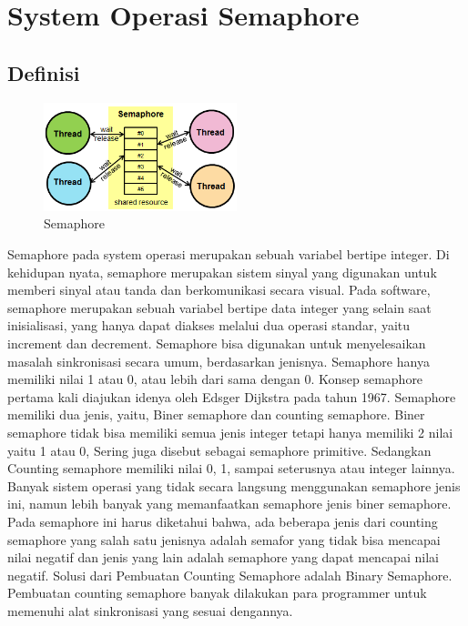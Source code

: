 \section{System Operasi Semaphore}

	\subsection{Definisi}
	
		\begin{figure}[ht]
			\centerline{\includegraphics[width=0.5\textwidth]{figures/sema.png}}
			\caption{Semaphore}
			\label{sema}
			\end{figure}
	
		Semaphore pada system operasi merupakan sebuah variabel bertipe integer. Di kehidupan nyata, semaphore merupakan sistem sinyal yang
		digunakan untuk memberi sinyal atau tanda dan berkomunikasi secara visual. Pada software, semaphore merupakan sebuah variabel bertipe data
		integer yang selain saat inisialisasi, yang hanya dapat diakses melalui dua operasi standar, yaitu increment dan decrement. Semaphore bisa digunakan untuk menyelesaikan masalah sinkronisasi secara umum, berdasarkan jenisnya. Semaphore hanya memiliki nilai 1 atau 0, atau lebih dari sama dengan 0. Konsep semaphore pertama kali diajukan idenya oleh Edsger Dijkstra pada tahun 1967. Semaphore memiliki dua jenis, yaitu, Biner semaphore dan counting semaphore. Biner semaphore tidak bisa memiliki semua jenis integer tetapi hanya memiliki 2 nilai yaitu 1 atau 0, Sering juga disebut sebagai semaphore primitive. Sedangkan Counting semaphore memiliki nilai 0, 1, sampai seterusnya atau integer lainnya. Banyak sistem operasi yang tidak secara langsung menggunakan semaphore jenis ini, namun lebih banyak yang memanfaatkan semaphore jenis biner semaphore. Pada semaphore ini harus diketahui bahwa, ada beberapa jenis dari counting semaphore yang salah satu jenisnya adalah semafor yang tidak bisa mencapai nilai negatif dan jenis yang lain adalah semaphore yang dapat mencapai nilai negatif. Solusi dari Pembuatan Counting Semaphore adalah Binary Semaphore. Pembuatan counting semaphore banyak dilakukan para programmer untuk memenuhi alat sinkronisasi yang sesuai dengannya. 
		
